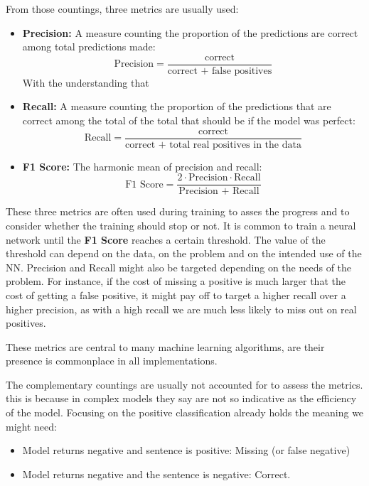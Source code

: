 \documentclass[a4paper, 11pt]{report}
\begin{document}
From those countings, three metrics are usually used:
\begin{itemize}
    \item \textbf{Precision:} A measure counting the proportion of the predictions are correct among total predictions made:
    \begin{equation*}
        \text{Precision}= \frac{\text{correct}}{\text{correct + false positives}}
    \end{equation*}
    With the understanding that

\item \textbf{Recall:} A measure counting the proportion of the predictions that are correct among the total of the total that should be if the model was perfect:
    \begin{equation*}
        \text{Recall}= \frac{\text{correct}}{\text{correct + total real positives in the data}}
    \end{equation*}

\item \textbf{F1 Score:} The harmonic mean of precision and recall:
    \begin{equation*}
        \text{F1 Score}= \frac{2\cdot\text{Precision}\cdot\text{Recall}}{\text{Precision + Recall}}
    \end{equation*}
\end{itemize}

These three metrics are often used during training to asses the progress and to consider whether the training should stop or not. It is common to train a neural network until the \textbf{F1 Score} reaches a certain threshold. The value of the threshold can depend on the data, on the problem and on the intended use of the NN. Precision and Recall might also be targeted depending on the needs of the problem. For instance, if the cost of missing a positive is much larger that the cost of getting a false positive, it might pay off to target a higher recall over a higher precision, as with a high recall we are much less likely to miss out on real positives.

These metrics are central to many machine learning algorithms, are their presence is commonplace in all implementations.

The complementary countings are usually not accounted for to assess the metrics. this is because in complex models they say are not so indicative as the efficiency of the model. Focusing on the positive classification already holds the meaning we might need:
\begin{itemize}
    \item Model returns negative and sentence is positive: Missing (or false negative)
    \item Model returns negative and the sentence is negative: Correct.
\end{itemize}
\end{document}
